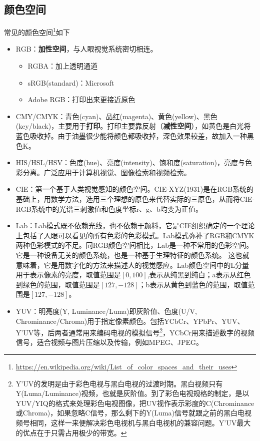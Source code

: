 \subsection{颜色空间}
常见的颜色空间\footnote{\url{https://en.wikipedia.org/wiki/List_of_color_spaces_and_their_uses}}如下
\begin{itemize}
	\item RGB：\textbf{加性空间}，与人眼视觉系统密切相连。
	\begin{itemize}
		\item RGBA：加上透明通道
		\item sRGB(standard)：Microsoft
		\item Adobe RGB：打印出来更接近原色
	\end{itemize}
	\item CMY/CMYK：青色(cyan)、品红(magenta)、黄色(yellow)、黑色(key/black)，主要用于\textbf{打印}。打印主要靠反射（\textbf{减性空间}），如黄色是白光将蓝色吸收掉。由于油墨很少能将颜色都吸收掉，深色效果较差，故加入一种黑色K。
	\item HIS/HSL/HSV：色度(hue)、亮度(intensity)、饱和度(saturation)，亮度与色彩分离。广泛应用于计算机视觉、图像检索和视频检索。
	\item CIE：第一个基于人类视觉感知的颜色空间。CIE-XYZ(1931)是在RGB系统的基础上，用数学方法，选用三个理想的原色来代替实际的三原色，从而将CIE-RGB系统中的光谱三刺激值和色度坐标r、g、b均变为正值。
	\item Lab：Lab模式既不依赖光线，也不依赖于颜料，它是CIE组织确定的一个理论上包括了人眼可以看见的所有色彩的色彩模式。Lab模式弥补了RGB和CMYK两种色彩模式的不足。同RGB颜色空间相比，Lab是一种不常用的色彩空间。它是一种设备无关的颜色系统，也是一种基于生理特征的颜色系统。
	这也就意味着，它是用数字化的方法来描述人的视觉感应。Lab颜色空间中的L分量用于表示像素的亮度，取值范围是$[0,100]$,表示从纯黑到纯白；a表示从红色到绿色的范围，取值范围是$[127,-128]$；b表示从黄色到蓝色的范围，取值范围是$[127,-128]$。
	\item YUV：明亮度(Y, Luminance/Luma)即灰阶值、色度(U/V, Chrominance/Chroma)用于指定像素颜色。包括YCbCr、YPbPr、YUV、Y'UV等，后两者通常用来编码电视的模拟信号\footnote{Y'UV的发明是由于彩色电视与黑白电视的过渡时期。黑白视频只有Y(Luma/Luminance)视频，也就是灰阶值。到了彩色电视规格的制定，是以YUV/YIQ的格式来处理彩色电视图像，把UV视作表示彩度的C(Chrominance或Chroma)，如果忽略C信号，那么剩下的Y(Luma)信号就跟之前的黑白电视频号相同，这样一来便解决彩色电视机与黑白电视机的兼容问题。Y'UV最大的优点在于只需占用极少的带宽。}，YCbCr用来描述数字的视频信号，适合视频与图片压缩以及传输，例如MPEG、JPEG。
\end{itemize}

